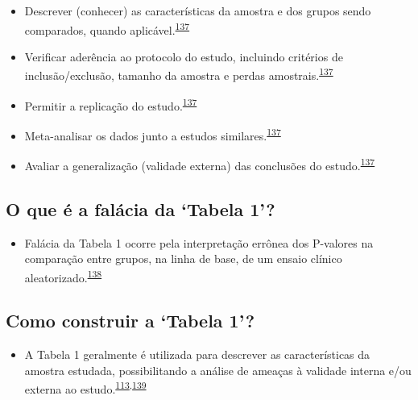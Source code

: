 \documentclass[
  a4paper,
]{book}
\providecommand{\tightlist}{%
  \setlength{\itemsep}{0pt}\setlength{\parskip}{0pt}}
\begin{document}
\begin{itemize}
\item
  Descrever (conhecer) as características da amostra e dos grupos sendo comparados, quando aplicável.\textsuperscript{\protect\hyperlink{ref-chen2020}{137}}
\item
  Verificar aderência ao protocolo do estudo, incluindo critérios de inclusão/exclusão, tamanho da amostra e perdas amostrais.\textsuperscript{\protect\hyperlink{ref-chen2020}{137}}
\item
  Permitir a replicação do estudo.\textsuperscript{\protect\hyperlink{ref-chen2020}{137}}
\item
  Meta-analisar os dados junto a estudos similares.\textsuperscript{\protect\hyperlink{ref-chen2020}{137}}
\item
  Avaliar a generalização (validade externa) das conclusões do estudo.\textsuperscript{\protect\hyperlink{ref-chen2020}{137}}
\end{itemize}

\hypertarget{o-que-uxe9-a-faluxe1cia-da-tabela-1}{%
\subsection{O que é a falácia da `Tabela 1'?}\label{o-que-uxe9-a-faluxe1cia-da-tabela-1}}

\begin{itemize}
\tightlist
\item
  Falácia da Tabela 1 ocorre pela interpretação errônea dos P-valores na comparação entre grupos, na linha de base, de um ensaio clínico aleatorizado.\textsuperscript{\protect\hyperlink{ref-pijls2022}{138}}
\end{itemize}

\hypertarget{como-construir-a-tabela-1}{%
\subsection{Como construir a `Tabela 1'?}\label{como-construir-a-tabela-1}}

\begin{itemize}
\tightlist
\item
  A Tabela 1 geralmente é utilizada para descrever as características da amostra estudada, possibilitando a análise de ameaças à validade interna e/ou externa ao estudo.\textsuperscript{\protect\hyperlink{ref-greenhalgh1997}{113},\protect\hyperlink{ref-Hayes-Larson2019}{139}}
\end{itemize}
\end{document}
